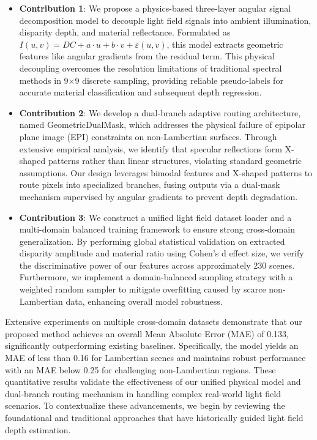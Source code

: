 \begin{itemize}
  \item \textbf{Contribution 1}: We propose a physics-based three-layer angular signal decomposition model to decouple light field signals into ambient illumination, disparity depth, and material reflectance. Formulated as $I(u,v) = DC + a \cdot u + b \cdot v + \varepsilon(u,v)$, this model extracts geometric features like angular gradients from the residual term. This physical decoupling overcomes the resolution limitations of traditional spectral methods in 9×9 discrete sampling, providing reliable pseudo-labels for accurate material classification and subsequent depth regression.
  \item \textbf{Contribution 2}: We develop a dual-branch adaptive routing architecture, named GeometricDualMask, which addresses the physical failure of epipolar plane image (EPI) constraints on non-Lambertian surfaces. Through extensive empirical analysis, we identify that specular reflections form X-shaped patterns rather than linear structures, violating standard geometric assumptions. Our design leverages bimodal features and X-shaped patterns to route pixels into specialized branches, fusing outputs via a dual-mask mechanism supervised by angular gradients to prevent depth degradation.
  \item \textbf{Contribution 3}: We construct a unified light field dataset loader and a multi-domain balanced training framework to ensure strong cross-domain generalization. By performing global statistical validation on extracted disparity amplitude and material ratio using Cohen's d effect size, we verify the discriminative power of our features across approximately 230 scenes. Furthermore, we implement a domain-balanced sampling strategy with a weighted random sampler to mitigate overfitting caused by scarce non-Lambertian data, enhancing overall model robustness.
\end{itemize}
Extensive experiments on multiple cross-domain datasets demonstrate that our proposed method achieves an overall Mean Absolute Error (MAE) of 0.133, significantly outperforming existing baselines. Specifically, the model yields an MAE of less than 0.16 for Lambertian scenes and maintains robust performance with an MAE below 0.25 for challenging non-Lambertian regions. These quantitative results validate the effectiveness of our unified physical model and dual-branch routing mechanism in handling complex real-world light field scenarios. To contextualize these advancements, we begin by reviewing the foundational and traditional approaches that have historically guided light field depth estimation.